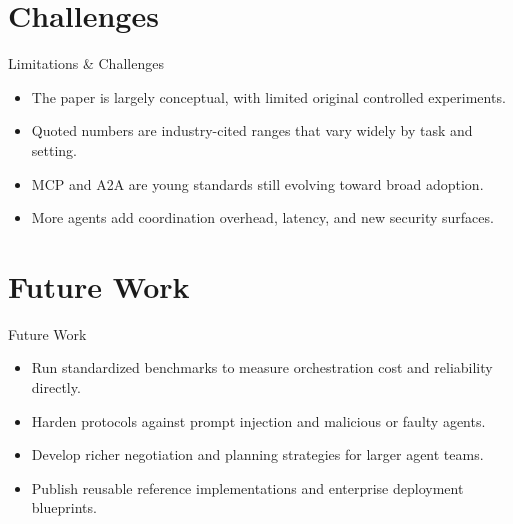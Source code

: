\documentclass[10pt]{beamer}
\begin{document}
\section{Challenges}
\begin{frame}{Limitations \& Challenges}
\begin{itemize}
  \item The paper is largely conceptual, with limited original controlled experiments.
  \item Quoted numbers are industry-cited ranges that vary widely by task and setting.
  \item MCP and A2A are young standards still evolving toward broad adoption.
  \item More agents add coordination overhead, latency, and new security surfaces.
\end{itemize}
\end{frame}
\section{Future Work}
\begin{frame}{Future Work}
\begin{itemize}
  \item Run standardized benchmarks to measure orchestration cost and reliability directly.
  \item Harden protocols against prompt injection and malicious or faulty agents.
  \item Develop richer negotiation and planning strategies for larger agent teams.
  \item Publish reusable reference implementations and enterprise deployment blueprints.
\end{itemize}
\end{frame}
\end{document}

